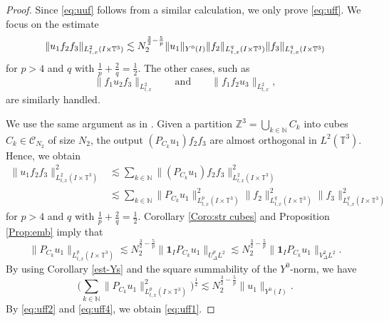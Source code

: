 \documentclass[letterpaper, 11pt,  reqno]{amsart}
\newcommand{\1}{\hspace{0.5mm}\text{I}\hspace{0.5mm}}
\newcommand{\Z}{\mathbb{Z}}
\newcommand{\T}{\mathbb{T}}
\newcommand{\les}{\lesssim}
\newcommand{\ind}{\mathbf 1}
\newcommand{\N}{\mathbb{N}}
\numberwithin{equation}{section}
\numberwithin{theorem}{section}
\begin{document}
\begin{proof}
Since \eqref{eq:uuf} follows from a similar calculation,
we only prove \eqref{eq:uff}.
We  focus on the estimate
\begin{equation}
\|u_1 f_2 f_3\|_{L^2_{t,x} (I \times \T^3) }
\\
\lesssim
N_2^{\frac{3}{2}-\frac{5}{p}}
\|u_1\|_{Y^0(I)}
\|f_2\|_{L^q_{t,x} (I \times \T^3)}
\|f_3\|_{L^q_{t,x} (I \times \T^3)}
\label{eq:uff1}
\end{equation}
for $p>4$ and $q$ with $\frac{1}{p}+\frac{2}{q}=\frac{1}{2}$.
The other cases, such as
\begin{equation*}
    \| f_1 u_2 f_3\|_{L^2_{t,x} }
    \quad\quad
    \text{and}
    \quad\quad
    \| f_1 f_2 u_3\|_{L^2_{t,x}},
\end{equation*}
are similarly handled.

We use the same argument as in \cite[Proposition 3.5]{HTT11}.
Given a partition $\Z^3 = \bigcup_{k \in \N} C_k$ into cubes $C_k \in \mathcal{C}_{N_2}$ of size $N_2$,
the output
$(P_{C_k} u_1) f_2 f_3$
are almost orthogonal in $L^2(\T^3)$.
Hence, we obtain
\begin{equation}
\begin{aligned}
\|  u_1  f_2  f_3 \|^2_{L^2_{t,x} (I \times \T^3)}
&\les
\sum_{k \in \N}
\| (P_{C_k} u_1)  f_2 f_3\|^2_{L^2_{t,x} (I \times \T^3) }
\\
&\les
\sum_{k \in \N}
\|P_{C_k} u_1\|^2_{L^p_{t,x} (I \times \T^3)}
\| f_2\|^2_{L^q_{t,x} (I \times \T^3)} \| f_3\|^2_{L^q_{t,x} (I \times \T^3)}
\end{aligned}
\label{eq:uff2}
\end{equation}
for
$p>4$ and $q$ with $\frac{1}{p}+\frac{2}{q}=\frac{1}{2}$.
Corollary \ref{Coro:str cubes} and Proposition \ref{Prop:emb}
imply that
\[
\|P_{C_k} u_1\|_{L^p_{t,x} (I \times \T^3)}
\les
N_2^{\frac 32-\frac{5}{p}} \| \ind_I P_{C_k} u_1\|_{U^p_\Delta L^2}
\les
N_2^{\frac 32-\frac{5}{p}} \| \ind_I P_{C_k} u_1\|_{V^2_\Delta L^2}.
\]
By using Corollary \ref{est-Ys} and the square summability of the $Y^0$-norm, we have
\begin{equation}
\Big(
\sum_{k \in \N}
\|P_{C_k} u_1\|^2_{L^p_{t,x} (I \times \T^3)}
\Big)^{\frac 12}
\les
N_2^{\frac 32-\frac{5}{p}} 
\| u_1 \|_{Y^0(I)}.
\label{eq:uff4}
\end{equation}
By \eqref{eq:uff2} and \eqref{eq:uff4},
we obtain \eqref{eq:uff1}.
\end{proof}
\end{document}
